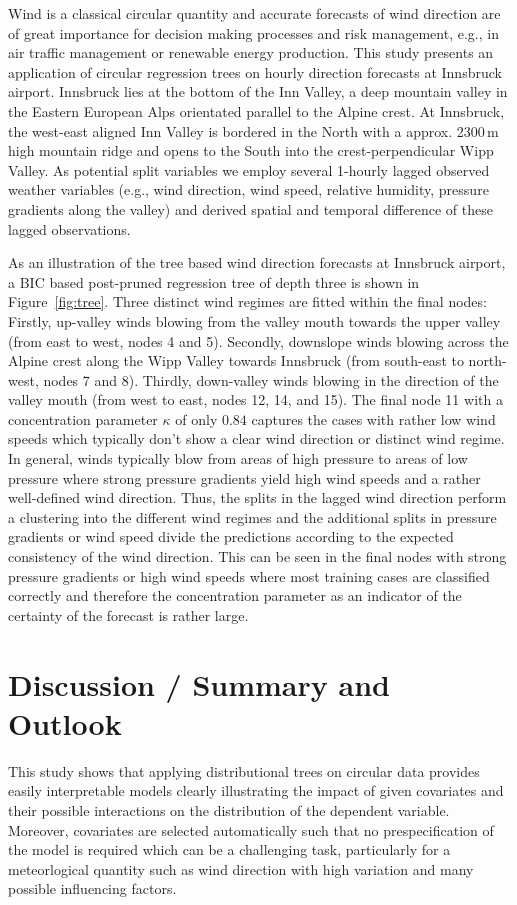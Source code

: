 \documentclass[twoside]{report}
\begin{document}
Wind is a classical circular quantity and accurate forecasts of wind direction
are of great importance for decision making processes and risk management,
e.g., in air traffic management or renewable energy production. This study
presents an application of circular regression trees  on hourly direction
forecasts at Innsbruck airport.  Innsbruck lies at the bottom of the Inn
Valley, a deep mountain valley in the Eastern European Alps orientated parallel
to the Alpine crest. At Innsbruck, the west-east aligned Inn Valley is bordered
in the North with a approx. 2300\,m high mountain ridge and opens to the South
into the crest-perpendicular Wipp Valley. As potential split variables we
employ several 1-hourly lagged observed weather variables (e.g., wind
direction, wind speed, relative humidity, pressure gradients along the valley)
and derived spatial and temporal difference of these lagged observations. 

As an illustration of the tree based wind direction forecasts at Innsbruck
airport, a BIC based post-pruned regression tree of depth three is shown in
Figure~\ref{fig:tree}. Three distinct wind regimes are fitted within the final
nodes: Firstly, up-valley winds blowing from the valley mouth towards the upper
valley (from east to west, nodes 4 and 5). Secondly, downslope winds blowing
across the Alpine crest along the Wipp Valley towards Innsbruck (from
south-east to north-west, nodes 7 and 8). Thirdly, down-valley winds blowing
in the direction of the valley mouth (from west to east, nodes 12, 14, and 15).
The final node 11 with a concentration parameter $\kappa$ of only $0.84$
captures the cases with rather low wind speeds which typically don't show a
clear wind direction or distinct wind regime. In general, winds typically blow
from areas of high pressure to areas of low pressure where strong pressure
gradients yield high wind speeds and a rather well-defined wind direction.
Thus, the splits in the lagged wind direction perform a clustering into the
different wind regimes and the additional splits in pressure gradients or wind
speed divide the predictions according to the expected consistency of the wind
direction. This can be seen in the final nodes with strong pressure gradients
or high wind speeds where most training cases are classified correctly and
therefore the concentration parameter as an indicator of the certainty of the
forecast is rather large. 

\section{Discussion / Summary and Outlook}
This study shows that applying distributional trees on circular data provides easily 
interpretable models clearly illustrating the impact of given covariates and their possible 
interactions on the distribution of the dependent variable. Moreover, covariates are selected
automatically such that no prespecification of the model is required which can be a challenging 
task, particularly for a meteorlogical quantity such as wind direction with high variation and 
many possible influencing factors.
\end{document}
